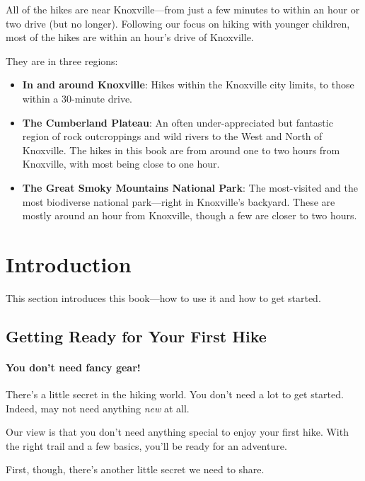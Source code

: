 \documentclass[
  letterpaper,
  DIV=11,
  numbers=noendperiod]{scrreprt}
\providecommand{\tightlist}{%
  \setlength{\itemsep}{0pt}\setlength{\parskip}{0pt}}\usepackage{longtable,booktabs,array}
\begin{document}
All of the hikes are near Knoxville---from just a few minutes to within
an hour or two drive (but no longer). Following our focus on hiking with
younger children, most of the hikes are within an hour's drive of
Knoxville.

They are in three regions:

\begin{itemize}
\tightlist
\item
  \textbf{In and around Knoxville}: Hikes within the Knoxville city
  limits, to those within a 30-minute drive.
\item
  \textbf{The Cumberland Plateau}: An often under-appreciated but
  fantastic region of rock outcroppings and wild rivers to the West and
  North of Knoxville. The hikes in this book are from around one to two
  hours from Knoxville, with most being close to one hour.
\item
  \textbf{The Great Smoky Mountains National Park}: The most-visited and
  the most biodiverse national park---right in Knoxville's backyard.
  These are mostly around an hour from Knoxville, though a few are
  closer to two hours.
\end{itemize}

\part{Introduction}

This section introduces this book---how to use it and how to get
started.

\chapter{Getting Ready for Your First
Hike}\label{getting-ready-for-your-first-hike}

\subsection{You don't need fancy gear!}\label{you-dont-need-fancy-gear}

There's a little secret in the hiking world. You don't need a lot to get
started. Indeed, may not need anything \emph{new} at all.

Our view is that you don't need anything special to enjoy your first
hike. With the right trail and a few basics, you'll be ready for an
adventure.

First, though, there's another little secret we need to share.
\end{document}
